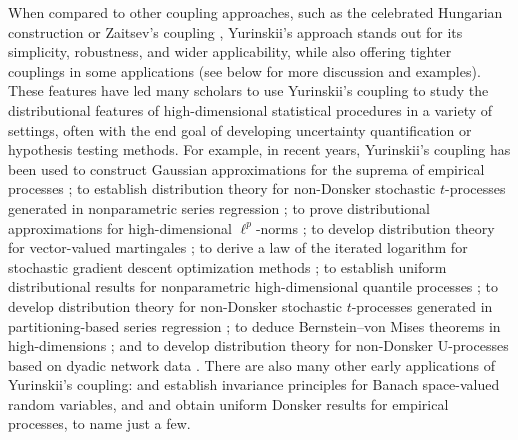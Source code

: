 When compared to other coupling approaches, such as the celebrated Hungarian
construction \citep{komlos1975approximation} or Zaitsev's coupling
\citep{zaitsev1987estimates,zaitsev1987gaussian}, Yurinskii's approach stands
out for its simplicity, robustness, and wider applicability, while also offering
tighter couplings in some applications (see below for more discussion and
examples). These features have led many scholars to use Yurinskii's coupling to
study the distributional features of high-dimensional statistical procedures in
a variety of settings, often with the end goal of developing uncertainty
quantification or hypothesis testing methods. For example, in recent years,
Yurinskii's coupling has been used
to construct Gaussian approximations for the suprema of empirical processes
\citep{chernozhukov2014gaussian};
%
to establish distribution theory for non-Donsker stochastic $t$-processes
generated in nonparametric series regression \citep{belloni2015some};
%
to prove distributional approximations for
high-dimensional $\ell^p$-norms \citep{biau2015high};
%
to develop distribution theory for vector-valued martingales
\citep{belloni2018high,li2020uniform};
%
to derive a law of the iterated logarithm for stochastic gradient descent
optimization methods \citep{anastasiou2019normal};
%
to establish uniform distributional results for nonparametric
high-dimensional quantile processes \citep{belloni2019conditional};
%
to develop distribution theory for non-Donsker stochastic
$t$-processes generated in partitioning-based series regression
\citep{cattaneo2020large};
%
to deduce Bernstein--von Mises theorems in high-dimensions
\citep{ray2021bernstein};
%
and to develop distribution theory for non-Donsker U-processes based on dyadic
network data \citep{cattaneo2024uniform}.
%
%
There are also many other early applications of Yurinskii's coupling:
\citet{dudley1983invariance} and \citet{dehling1983limit} establish invariance
principles for Banach space-valued random variables, and \citet{lecam1988} and
\citet{sheehy1992uniform} obtain uniform Donsker results for empirical
processes, to name just a few.


